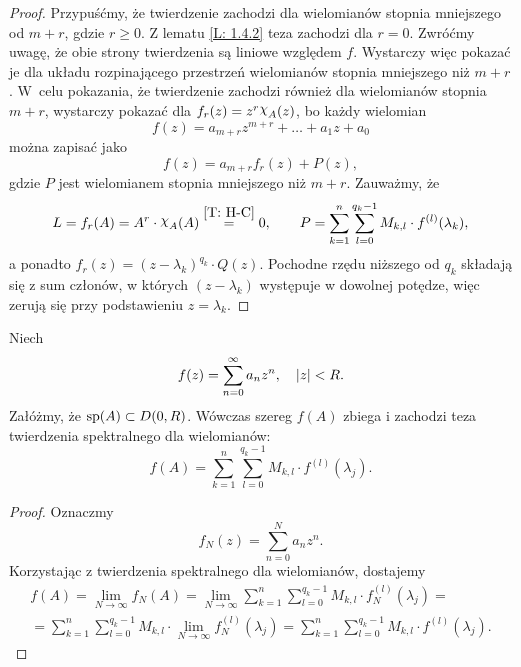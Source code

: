 \begin{proof}
  Przypuśćmy, że twierdzenie zachodzi dla wielomianów stopnia mniejszego od $m+r$, gdzie $r \geq 0$. Z lematu 
  \ref{L: 1.4.2} teza zachodzi dla $r=0$. Zwróćmy uwagę, że obie strony twierdzenia są liniowe względem $f$. 
  Wystarczy więc pokazać je dla układu rozpinającego przestrzeń wielomianów stopnia mniejszego niż $m+r$. W~celu 
  pokazania, że twierdzenie zachodzi również dla wielomianów stopnia $m+r$, wystarczy pokazać dla $f_r(z) = z^r 
  \mychi_A(z)$, bo każdy wielomian
%
  \begin{equation*}
    f(z) = a_{m+r} z^{m+r} + \ldots + a_1 z + a_0
  \end{equation*}
%
  można zapisać jako
%
  \begin{equation*}
    f(z) = a_{m+r} f_r(z) + P(z),
  \end{equation*}
%
  gdzie $P$ jest wielomianem stopnia mniejszego niż $m+r$. Zauważmy, że
%
  \begin{equation*}
    L = f_r(A) = A^r \cdot \mychi_A(A) \overset{\ref{T: H-C}}{=} 0, \qquad 
    P = \sum_{k=1}^n \sum_{l=0}^{q_k-1} M_{k,l} \cdot f^{(l)}(\lambda_k),
  \end{equation*}
%
  a ponadto $f_r(z) = (z-\lambda_k)^{q_k} \cdot Q(z)$. Pochodne rzędu niższego od $q_k$ składają się z sum członów, w 
  których $(z-\lambda_k)$ występuje w dowolnej potędze, więc zerują się przy podstawieniu $z=\lambda_k$.
%
\end{proof}
%
\begin{theorem}
  Niech
%
  \begin{equation*}
    f(z) = \sum_{n=0}^{\infty} a_n z^n, \quad \lvert z\rvert < R.
  \end{equation*}
%
  Załóżmy, że $\operatorname{sp}(A) \subset D(0,R)$. Wówczas szereg $f(A)$ zbiega i zachodzi teza twierdzenia spektralnego dla 
  wielomianów:
%
  \begin{equation*}
    f(A) = \sum_{k=1}^{n} \sum_{l=0}^{q_k-1} M_{k,l} \cdot f^{(l)}(\lambda_j).
  \end{equation*}
\end{theorem}
%
\begin{proof}
  Oznaczmy
%
  \begin{equation*}
    f_N(z) = \sum_{n=0}^N a_n z^n.
  \end{equation*}
%
  Korzystając z twierdzenia spektralnego dla wielomianów, dostajemy
%
  \begin{multline*}
    f(A) = \lim_{N\to\infty} f_N(A) 
    = \lim_{N\to\infty} \sum_{k=1}^{n} \sum_{l=0}^{q_k-1} M_{k,l} \cdot f_N^{(l)}(\lambda_j) = \\
    = \sum_{k=1}^{n} \sum_{l=0}^{q_k-1} M_{k,l} \cdot \lim_{N\to\infty} f_N^{(l)}(\lambda_j)
    = \sum_{k=1}^{n} \sum_{l=0}^{q_k-1} M_{k,l} \cdot f^{(l)}(\lambda_j). \tag*{\qedhere}
  \end{multline*}
\end{proof}
































